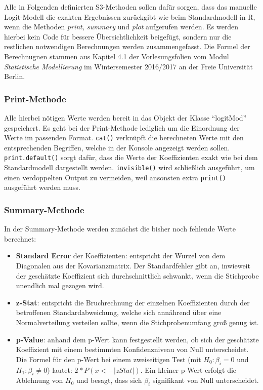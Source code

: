 \documentclass[12pt,]{article}
\providecommand{\tightlist}{%
  \setlength{\itemsep}{0pt}\setlength{\parskip}{0pt}}
\begin{document}
Alle in Folgenden definierten S3-Methoden sollen dafür sorgen, dass das
manuelle Logit-Modell die exakten Ergebnissen zurückgibt wie beim
Standardmodell in R, wenn die Methoden \emph{print, summary} und
\emph{plot} aufgerufen werden. Es werden hierbei kein Code für bessere
Übersichtlichkeit beigefügt, sondern nur die restlichen notwendigen
Berechnungen werden zusammengefasst. Die Formel der Berechnugnen stammen
aus Kapitel 4.1 der Vorlesungsfolien vom Modul \emph{Statistische
Modellierung} im Wintersemester 2016/2017 an der Freie Universität
Berlin.

\subsubsection{Print-Methode}\label{print-methode}

Alle hierbei nötigen Werte werden bereit in das Objekt der Klasse
``logitMod'' gespeichert. Es geht bei der Print-Methode lediglich um die
Einordnung der Werte im passenden Format. \texttt{cat()} verknüpft die
berechneten Werte mit den entsprechenden Begriffen, welche in der
Konsole angezeigt werden sollen. \texttt{print.default()} sorgt dafür,
dass die Werte der Koeffizienten exakt wie bei dem Standardmodell
dargestellt werden. \texttt{invisible()} wird schließlich ausgeführt, um
einen verdoppelten Output zu vermeiden, weil ansonsten extra
\texttt{print()} ausgeführt werden muss.

\subsubsection{Summary-Methode}\label{summary-methode}

In der Summary-Methode werden zunächst die bisher noch fehlende Werte
berechnet:

\begin{itemize}
\tightlist
\item
  \textbf{Standard Error} der Koeffizienten: entspricht der Wurzel von
  dem Diagonalen aus der Kovarianzmatrix. Der Standardfehler gibt an,
  inwieweit der geschätzte Koeffizient sich durchschnittlich schwankt,
  wenn die Stichprobe unendlich mal gezogen wird.
\item
  \textbf{z-Stat}: entspricht die Bruchrechnung der einzelnen
  Koeffizienten durch der betroffenen Standardabweichung, welche sich
  annährend über eine Normalverteilung verteilen sollte, wenn die
  Stichprobenumfang groß genug ist.
\item
  \textbf{p-Value}: anhand dem p-Wert kann festgestellt werden, ob sich
  der geschätzte Koeffizient mit einem bestimmten Konfidenzniveau von
  Null unterscheidet. Die Formel für den p-Wert bei einem zweiseitigen
  Test (mit \(H_0: \beta_i = 0\) und \(H_1: \beta_i \neq 0\)) lautet:
  \(2 * P(x < -|zStat|)\). Ein kleiner p-Wert erfolgt die Ablehnung von
  \(H_0\) und besagt, dass sich \(\beta_i\) signifikant von Null
  unterscheidet.
\end{itemize}
\end{document}
